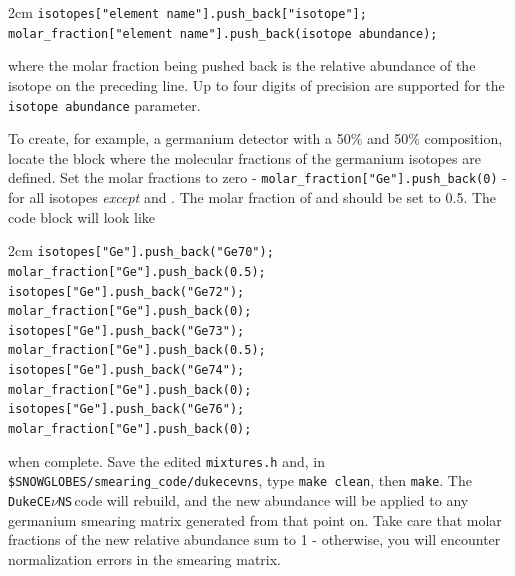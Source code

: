 \documentclass{article}
\newcommand{\dukecev}{\texttt{DukeCE$\nu$NS}\,}
\begin{document}
\begin{adjustwidth}{2cm}{}
    \texttt{isotopes["element name"].push\_back["isotope"];}\\
    \texttt{molar\_fraction["element name"].push\_back(isotope abundance);}
\end{adjustwidth}

\noindent where the molar fraction being pushed back is the relative abundance of the isotope on the preceding line. Up to four digits of precision are supported for the \texttt{isotope abundance} parameter.

To create, for example, a germanium detector with a 50\%  and 50\%  composition, locate the block where the molecular fractions of the germanium isotopes are defined. Set the molar fractions to zero - \texttt{molar\_fraction["Ge"].push\_back(0)} - for all isotopes \textit{except}  and . The molar fraction of  and  should be set to 0.5. The code block will look like

\begin{adjustwidth}{2cm}{}
  \texttt{isotopes["Ge"].push\_back("Ge70");}\\
  \texttt{molar\_fraction["Ge"].push\_back(0.5);}\\
  \texttt{isotopes["Ge"].push\_back("Ge72");}\\
  \texttt{molar\_fraction["Ge"].push\_back(0);}\\
  \texttt{isotopes["Ge"].push\_back("Ge73");}\\
  \texttt{molar\_fraction["Ge"].push\_back(0.5);}\\
  \texttt{isotopes["Ge"].push\_back("Ge74");}\\
  \texttt{molar\_fraction["Ge"].push\_back(0);}\\
  \texttt{isotopes["Ge"].push\_back("Ge76");}\\
  \texttt{molar\_fraction["Ge"].push\_back(0);}\\
\end{adjustwidth}

\noindent when complete. Save the edited \texttt{mixtures.h} and, in \texttt{\$SNOWGLOBES/smearing\_code/dukecevns}, type \texttt{make clean}, then \texttt{make}. The \dukecev code will rebuild, and the new abundance will be applied to any germanium smearing matrix generated from that point on. Take care that molar fractions of the new relative abundance sum to 1 - otherwise, you will encounter normalization errors in the smearing matrix. 
\end{document}
